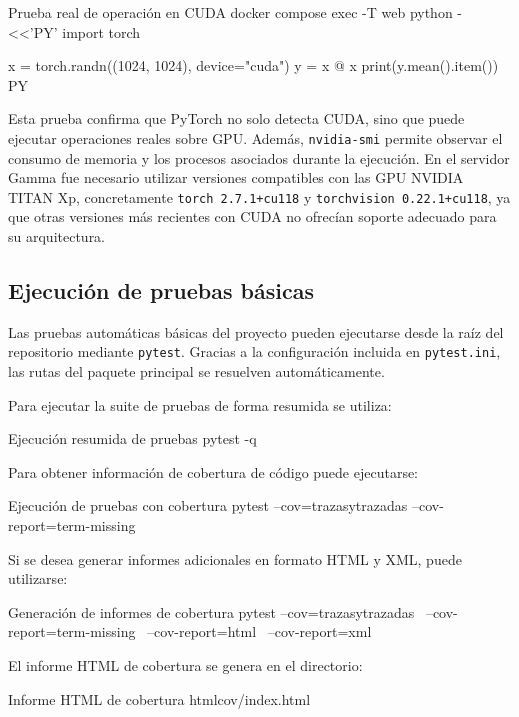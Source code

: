 \begin{dockerbox}{Prueba real de operación en CUDA}
docker compose exec -T web python - <<'PY'
import torch

x = torch.randn((1024, 1024), device="cuda")
y = x @ x
print(y.mean().item())
PY
\end{dockerbox}

Esta prueba confirma que PyTorch no solo detecta CUDA, sino que puede ejecutar operaciones reales sobre GPU. Además, \texttt{nvidia-smi} permite observar el consumo de memoria y los procesos asociados durante la ejecución. En el servidor Gamma fue necesario utilizar versiones compatibles con las GPU NVIDIA TITAN Xp, concretamente \texttt{torch 2.7.1+cu118} y \texttt{torchvision 0.22.1+cu118}, ya que otras versiones más recientes con CUDA no ofrecían soporte adecuado para su arquitectura.

\subsection{Ejecución de pruebas básicas}

Las pruebas automáticas básicas del proyecto pueden ejecutarse desde la raíz del repositorio mediante \texttt{pytest}. Gracias a la configuración incluida en \texttt{pytest.ini}, las rutas del paquete principal se resuelven automáticamente.

Para ejecutar la suite de pruebas de forma resumida se utiliza:

\begin{testbox}{Ejecución resumida de pruebas}
pytest -q
\end{testbox}

Para obtener información de cobertura de código puede ejecutarse:

\begin{testbox}{Ejecución de pruebas con cobertura}
pytest --cov=trazasytrazadas --cov-report=term-missing
\end{testbox}

Si se desea generar informes adicionales en formato HTML y XML, puede utilizarse:

\begin{testbox}{Generación de informes de cobertura}
pytest --cov=trazasytrazadas \
--cov-report=term-missing \
--cov-report=html \
--cov-report=xml
\end{testbox}

El informe HTML de cobertura se genera en el directorio:

\begin{infocmdbox}{Informe HTML de cobertura}
htmlcov/index.html
\end{infocmdbox}

